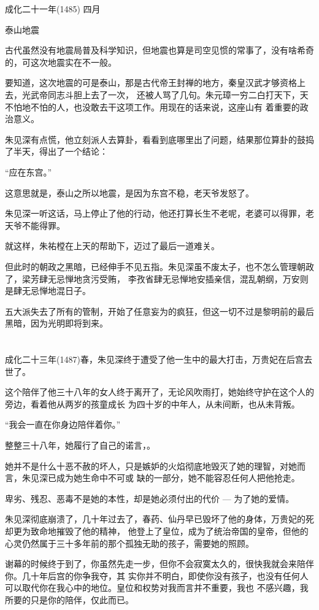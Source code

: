 \documentclass[11pt,a4paper,onecolumn]{article}
\begin{document}
成化二十一年(1485) 四月

泰山地震

古代虽然没有地震局普及科学知识，但地震也算是司空见惯的常事了，没有啥希奇的，可这次地震实在不一般。

要知道，这次地震的可是泰山，那是古代帝王封禅的地方，秦皇汉武才够资格上去，光武帝同志斗胆上去了一次，
还被人骂了几句。朱元璋一穷二白打天下，天不怕地不怕的人，也没敢去干这项工作。用现在的话来说，这座山有
着重要的政治意义。

朱见深有点慌，他立刻派人去算卦，看看到底哪里出了问题，结果那位算卦的鼓捣了半天，得出了一个结论：

``应在东宫。''

这意思就是，泰山之所以地震，是因为东宫不稳，老天爷发怒了。

朱见深一听这话，马上停止了他的行动，他还打算长生不老呢，老婆可以得罪，老天爷不能得罪。

就这样，朱祐樘在上天的帮助下，迈过了最后一道难关。

但此时的朝政之黑暗，已经伸手不见五指。朱见深虽不废太子，也不怎么管理朝政了，梁芳肆无忌惮地贪污受贿，
李孜省肆无忌惮地安插亲信，混乱朝纲，万安则是肆无忌惮地混日子。

五大派失去了所有的管制，开始了任意妄为的疯狂，但这一切不过是黎明前的最后黑暗，因为光明即将到来。

\section[\thesection]{}

成化二十三年(1487)春，朱见深终于遭受了他一生中的最大打击，万贵妃在后宫去世了。

这个陪伴了他三十八年的女人终于离开了，无论风吹雨打，她始终守护在这个人的旁边，看着他从两岁的孩童成长
为四十岁的中年人，从未间断，也从未背叛。

``我会一直在你身边陪伴着你。''

整整三十八年，她履行了自己的诺言，。

她并不是什么十恶不赦的坏人，只是嫉妒的火焰彻底地毁灭了她的理智，对她而言，朱见深已成为她生命中不可或
缺的一部分，她不能容忍任何人把他抢走。

卑劣、残忍、恶毒不是她的本性，却是她必须付出的代价 --- 为了她的爱情。

朱见深彻底崩溃了，几十年过去了，春药、仙丹早已毁坏了他的身体，万贵妃的死却更为致命地摧毁了他的精神，
他登上了皇位，成为了统治帝国的皇帝，但他的心灵仍然属于三十多年前的那个孤独无助的孩子，需要她的照顾。

谢幕的时候终于到了，你虽然先走一步，但你不会寂寞太久的，很快我就会来陪伴你。几十年后宫的你争我夺，其
实你并不明白，即使你没有孩子，也没有任何人可以取代你在我心中的地位。皇位和权势对我而言并不重要，我也
不感兴趣，我所要的只是你的陪伴，仅此而已。
\end{document}

